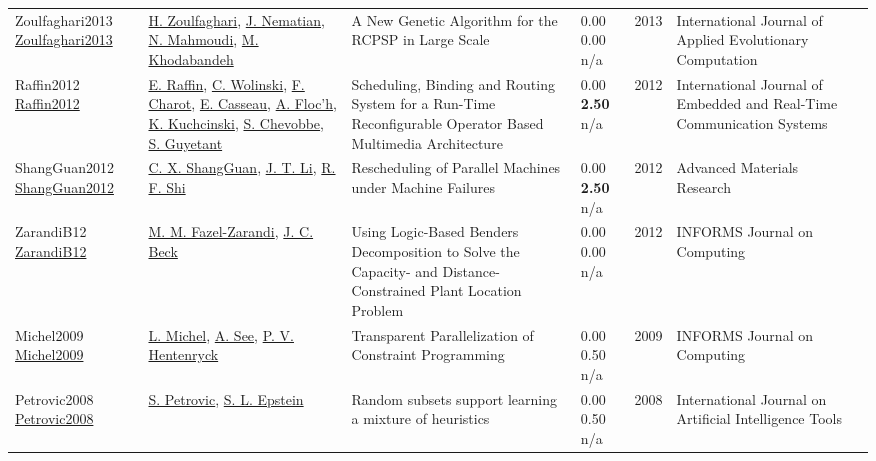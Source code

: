 {\begin{longtable}{p{3cm}p{5cm}p{10cm}p{1cm}rp{2.5cm}l}
Zoulfaghari2013 \href{http://dx.doi.org/10.4018/jaec.2013040103}{Zoulfaghari2013} & \hyperref[auth:a1755]{H. Zoulfaghari}, \hyperref[auth:a1756]{J. Nematian}, \hyperref[auth:a1757]{N. Mahmoudi}, \hyperref[auth:a1758]{M. Khodabandeh} & A New Genetic Algorithm for the RCPSP in Large Scale & \noindent{}\textcolor{black!50}{0.00} \textcolor{black!50}{0.00} n/a & 2013 & International Journal of Applied Evolutionary Computation & \cite{Zoulfaghari2013}\\
Raffin2012 \href{http://dx.doi.org/10.4018/jertcs.2012010101}{Raffin2012} & \hyperref[auth:a1529]{E. Raffin}, \hyperref[auth:a658]{C. Wolinski}, \hyperref[auth:a1530]{F. Charot}, \hyperref[auth:a1531]{E. Casseau}, \hyperref[auth:a1532]{A. Floc’h}, \hyperref[auth:a659]{K. Kuchcinski}, \hyperref[auth:a1533]{S. Chevobbe}, \hyperref[auth:a1534]{S. Guyetant} & \cellcolor{green!10}Scheduling, Binding and Routing System for a Run-Time Reconfigurable Operator Based Multimedia Architecture & \noindent{}\textcolor{black!50}{0.00} \textbf{2.50} n/a & 2012 & International Journal of Embedded and Real-Time Communication Systems & \cite{Raffin2012}\\
ShangGuan2012 \href{http://dx.doi.org/10.4028/www.scientific.net/amr.443-444.724}{ShangGuan2012} & \hyperref[auth:a1980]{C. X. ShangGuan}, \hyperref[auth:a1981]{J. T. Li}, \hyperref[auth:a1982]{R. F. Shi} & Rescheduling of Parallel Machines under Machine Failures & \noindent{}\textcolor{black!50}{0.00} \textbf{2.50} n/a & 2012 & Advanced Materials Research & \cite{ShangGuan2012}\\
ZarandiB12 \href{http://dx.doi.org/10.1287/ijoc.1110.0458}{ZarandiB12} & \hyperref[auth:a944]{M. M. Fazel-Zarandi}, \hyperref[auth:a89]{J. C. Beck} & Using Logic-Based Benders Decomposition to Solve the Capacity- and Distance-Constrained Plant Location Problem & \noindent{}\textcolor{black!50}{0.00} \textcolor{black!50}{0.00} n/a & 2012 & \cellcolor{red!20}INFORMS Journal on Computing & \cite{ZarandiB12}\\
Michel2009 \href{http://dx.doi.org/10.1287/ijoc.1080.0313}{Michel2009} & \hyperref[auth:a32]{L. Michel}, \hyperref[auth:a1804]{A. See}, \hyperref[auth:a148]{P. V. Hentenryck} & Transparent Parallelization of Constraint Programming & \noindent{}\textcolor{black!50}{0.00} 0.50 n/a & 2009 & \cellcolor{red!20}INFORMS Journal on Computing & \cite{Michel2009}\\
Petrovic2008 \href{http://dx.doi.org/10.1142/s0218213008004023}{Petrovic2008} & \hyperref[auth:a1858]{S. Petrovic}, \hyperref[auth:a1859]{S. L. Epstein} & \cellcolor{green!10}Random subsets support learning a mixture of heuristics & \noindent{}\textcolor{black!50}{0.00} 0.50 n/a & 2008 & International Journal on Artificial Intelligence Tools & \cite{Petrovic2008}\\

\end{longtable}}
